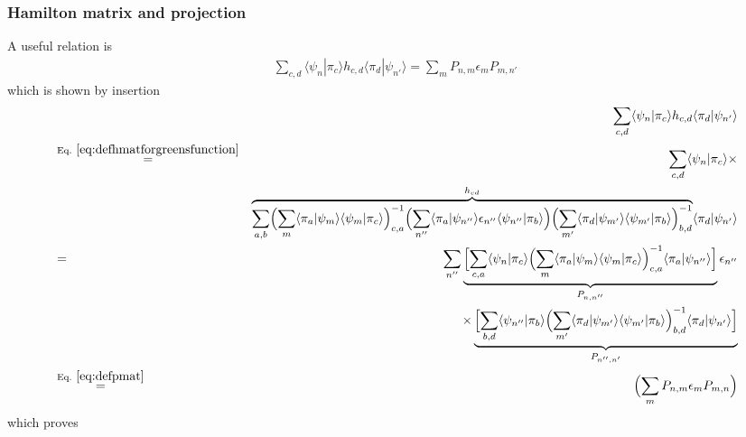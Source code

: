 \documentclass[11pt,a4paper]{report}
\begin{document}
\subsubsection{Hamilton matrix and projection}
A useful relation is 
\begin{eqnarray}
\sum_{c,d}\langle\psi_n|\pi_c\rangle h_{c,d}
\langle\pi_d|\psi_{n'}\rangle
=\sum_{m}P_{n,m}\epsilon_mP_{m,n'}
\label{eq:greenmatrixpep}
\end{eqnarray} 
which is shown by insertion
\begin{eqnarray}
&&\sum_{c,d}\langle\psi_n|\pi_c\rangle h_{c,d}
\langle\pi_d|\psi_{n'}\rangle
\nonumber\\
&\eqrel{eq:defhmatforgreensfunction}{=}&\sum_{c,d}
\langle\psi_n|\pi_c\rangle \times
\nonumber\\
&&\overbrace{\sum_{a,b}
\Bigl(\sum_m\langle\pi_a|\psi_m\rangle\langle\psi_m|\pi_c\rangle \Bigr)^{-1}_{c,a}
\Bigl(\sum_{n''}
\langle\pi_a|\psi_{n''}\rangle
\epsilon_{n''}
\langle\psi_{n''}|\pi_b\rangle\Bigr)
\Bigl(\sum_{m'}
\langle\pi_d|\psi_{m'}\rangle\langle\psi_{m'}|\pi_b\rangle \Bigr)^{-1}_{b,d}
}^{h_{cd}}
\langle\pi_d|\psi_{n'}\rangle
\nonumber\\
&=&
\sum_{n''}
\underbrace{\Bigl[\sum_{c,a}
\langle\psi_n|\pi_c\rangle 
\Bigl(\sum_m\langle\pi_a|\psi_m\rangle\langle\psi_m|\pi_c\rangle \Bigr)^{-1}_{c,a}
\langle\pi_a|\psi_{n''}\rangle\Bigr]}_{P_{n,n''}}
\epsilon_{n''}
\nonumber\\
&&\times\underbrace{\Bigl[\sum_{b,d}\langle\psi_{n''}|\pi_b\rangle
\Bigl(\sum_{m'}
\langle\pi_d|\psi_{m'}\rangle\langle\psi_{m'}|\pi_b\rangle \Bigr)^{-1}_{b,d}
\langle\pi_d|\psi_{n'}\rangle\Bigr]}_{P_{n'',n'}}
\nonumber\\
&\eqrel{eq:defpmat}{=}&\Bigl(\sum_{m}P_{n,m}\epsilon_{m}P_{m,n}\Bigr)
\nonumber
\end{eqnarray}
which proves 

\end{document}
